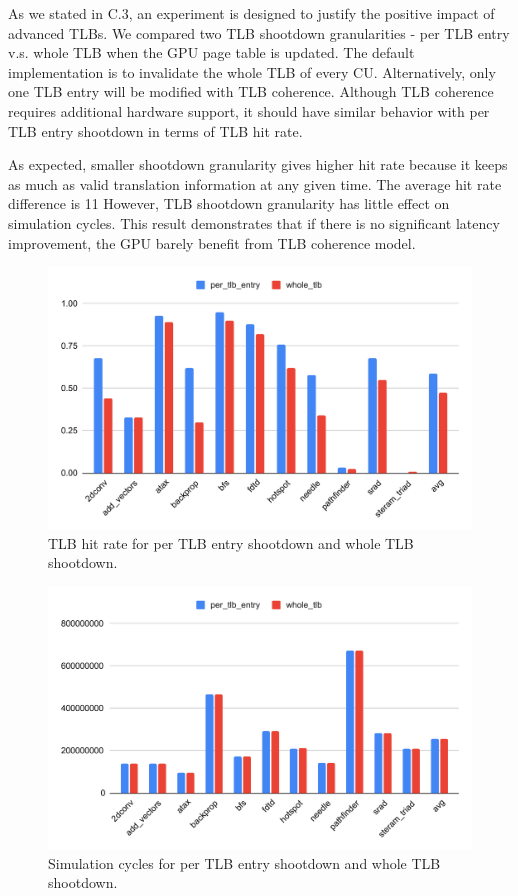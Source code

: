As we stated in C.3, an experiment is designed to justify the positive impact of advanced TLBs. We compared two TLB shootdown granularities - per TLB entry v.s. whole TLB when the GPU page table is updated. The default implementation is to invalidate the whole TLB of every CU. Alternatively, only one TLB entry will be modified with TLB coherence. Although TLB coherence requires additional hardware support, it should have similar behavior with per TLB entry shootdown in terms of TLB hit rate.


As expected, smaller shootdown granularity gives higher hit rate because it keeps as much as valid translation information at any given time. The average hit rate difference is 11%
However, TLB shootdown granularity has little effect on simulation cycles. This result demonstrates that if there is no significant latency improvement, the GPU barely benefit from TLB coherence model.

    \begin{figure}[!htb]
      \centering
      \setlength{\abovecaptionskip}{6pt plus 1pt minus 1pt}
      \includegraphics[width=.90\textwidth,keepaspectratio]{figures1/tlb_hit_rate.elf}
      \captionsetup{width=.75\textwidth}
      \caption{TLB hit rate for per TLB entry shootdown and whole TLB shootdown.}
      \label{fig:tlb_hr}
   \end{figure}

   \begin{figure}[!htb]
      \centering
      \setlength{\abovecaptionskip}{6pt plus 1pt minus 1pt}
      \includegraphics[width=.90\textwidth,keepaspectratio]{figures1/tlb_cycles.elf}
      \captionsetup{width=.75\textwidth}
      \caption{Simulation cycles for per TLB entry shootdown and whole TLB shootdown.}
      \label{fig:tlb_cycles}
   \end{figure}
